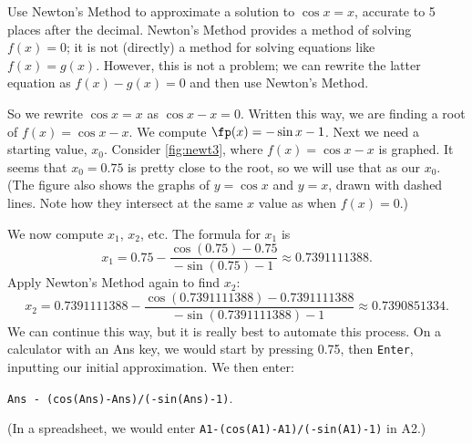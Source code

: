 \begin{example}\label{ex_newt3}%
Use Newton's Method to approximate a solution to $\cos x=x$, accurate to 5 places after the decimal.
\solution
Newton's Method provides a method of solving $f(x) = 0$; it is not (directly) a method for solving equations like $f(x) = g(x)$. However, this is not a problem; we can rewrite the latter equation as $f(x) - g(x)=0$ and then use Newton's Method. 

So we rewrite $\cos x=x$ as $\cos{x}-x=0$.  Written this way, we are finding a root of $f(x)=\cos{x}-x$.  We compute $\fp(x)=-\sin{x} - 1$.  Next we need a starting value, $x_0$.  Consider \autoref{fig:newt3}, where $f(x) = \cos x-x$ is graphed. It seems that $x_0=0.75$ is pretty close to the root, so we will use that as our $x_0$. (The figure also shows the graphs of $y=\cos x$ and $y=x$, drawn with dashed lines. Note how they intersect at the same $x$ value as when $f(x) = 0$.)


We now compute $x_1$, $x_2$, etc.  The formula for $x_1$ is 
\[x_1 = 0.75 - \frac{\cos(0.75)-0.75}{-\sin(0.75)-1}\approx 0.7391111388.\]
Apply Newton's Method again to find $x_2$:
\[x_2 = 0.7391111388 - \frac{\cos(0.7391111388)-0.7391111388}{-\sin(0.7391111388)-1}\approx 0.7390851334.\]
We can continue this way, but it is really best to automate this process.  On a calculator with an Ans key, we would start by pressing 0.75, then \texttt{Enter}, inputting our initial approximation. We then enter:
\begin{center}\texttt{Ans - (cos(Ans)-Ans)/(-sin(Ans)-1)}.\end{center}
(In a spreadsheet, we would enter \texttt{A1-(cos(A1)-A1)/(-sin(A1)-1)} in A2.)


\end{example}
